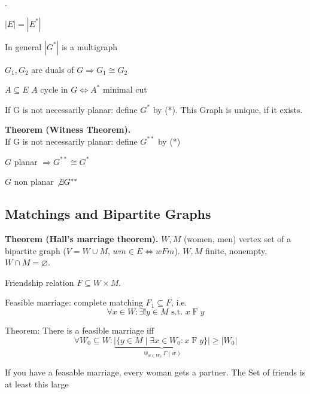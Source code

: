 

\def \GammaPlus {\Gamma^{+}}

\Remark.
\begin{compactenum}
  \item $|E| = |E^*|$
  \item In general $|G^*|$ is a multigraph
  \item $G_1, G_2$ are duals of $G \Rightarrow G_1 \cong G_2$
\end{compactenum}

$A \subseteq E$    
$A$ cycle in $G \iff A^*$ minimal cut

If G is not necessarily planar: define $G^*$ by (*).
This Graph is unique, if it exists.

\textbf{Theorem (Witness Theorem).} \\
If G is not necessarily planar: define $G^{**}$ by (*)
\begin{compactitem}
  \item $G$ planar $\Rightarrow G^{**} \cong G^*$
  \item $G$ non planar $\not\exists G^{**}$
\end{compactitem}


\subsection*{Matchings and Bipartite Graphs}

\strut{}
\textbf{Theorem (Hall's marriage theorem).}
$W, M$ (women, men) vertex set of a bipartite graph
($V=W\cup M$, $wm \in E \iff wFm$). $W,M$ finite, nonempty, $W\cap M=\varnothing$.

Friendship relation $F\subseteq W\times M$.

Feasible marriage: complete matching $F_1\subseteq F$, i.e.
\[ \forall x\in W: \exists! y\in M\text{ s.t. }x\operatorname{F} y \]

Theorem: There is a feasible marriage iff
\[
    \forall W_0\subseteq W:
        \underbrace{
            |\{y\in M\mid \exists x\in W_0: x\operatorname{F} y\}|
        }_{\Cup_{w\in W_0} \Gamma(w)}
        ≥ |W_0|
\]

If you have a feasable marriage, every woman gets a partner.
The Set of friends is at least this large

